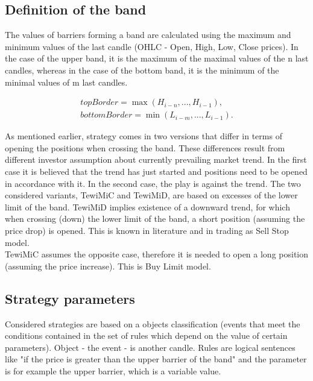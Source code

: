 \documentclass{tewiart}
\begin{document}
\subsection{Definition of the band}
The values of barriers forming a band are calculated using the maximum and minimum values of the last candle (OHLC - Open, High, Low, Close prices). In the case of the upper band, it is the maximum of the maximal values of the n last candles, whereas in the case of the bottom band, it is the minimum of the minimal values of m last candles. 

\begin{equation}
\begin{split}
topBorder = \max{(H_{i-n},...,H_{i-1})}, \\ 
bottomBorder = \min{(L_{i-m},...,L_{i-1})}.
\end{split}
\end{equation}

As mentioned earlier, strategy comes in two versions that differ in terms of opening the positions when crossing the band. These differences result from different investor assumption about currently prevailing market trend. In the first case it is believed that the trend has just started and positions need to be opened in accordance with it. In the second case, the play is against the trend. The two considered variants, TewiMiC and TewiMiD, are based on excesses of the lower limit of the band. TewiMiD implies existence of a downward trend, for which when crossing (down) the lower limit of the band, a short position (assuming the price drop) is opened. This is known in literature and in trading as Sell Stop model. \\

TewiMiC assumes the opposite case, therefore it is needed to open a long position (assuming the price increase).  This is Buy Limit model.

\subsection{Strategy parameters}
Considered strategies are based on a objects classification (events that meet the conditions contained in the set of rules which depend on the  value of certain parameters). Object - the event - is another candle. Rules are logical sentences like "if the price is greater than the upper barrier of the band" and the parameter is for example the upper barrier, which is a variable value. \\
\end{document}

